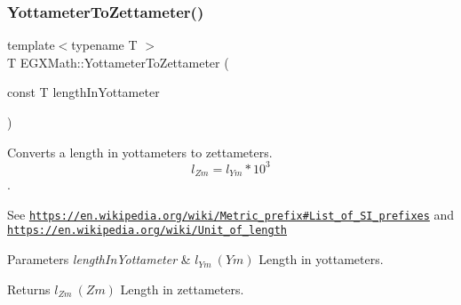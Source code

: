 \subsubsection{\texorpdfstring{Yottameter\+To\+Zettameter()}{YottameterToZettameter()}}
{\footnotesize\ttfamily template$<$typename T $>$ \\
T E\+G\+X\+Math\+::\+Yottameter\+To\+Zettameter (\begin{DoxyParamCaption}\item[{const T}]{length\+In\+Yottameter }\end{DoxyParamCaption})}



Converts a length in yottameters to zettameters. \[ l_{Zm}=l_{Ym} * 10^{3} \]. 

See \href{https://en.wikipedia.org/wiki/Metric_prefix#List_of_SI_prefixes}{\tt https\+://en.\+wikipedia.\+org/wiki/\+Metric\+\_\+prefix\#\+List\+\_\+of\+\_\+\+S\+I\+\_\+prefixes} and \href{https://en.wikipedia.org/wiki/Unit_of_length}{\tt https\+://en.\+wikipedia.\+org/wiki/\+Unit\+\_\+of\+\_\+length} 
\begin{DoxyParams}{Parameters}
{\em length\+In\+Yottameter} & $ l_{Ym}\ (Ym)$ Length in yottameters. \\
\hline
\end{DoxyParams}
\begin{DoxyReturn}{Returns}
$ l_{Zm}\ (Zm)$ Length in zettameters. 
\end{DoxyReturn}
